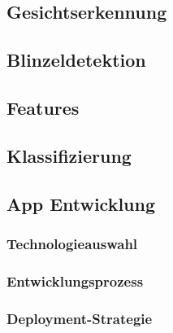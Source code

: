 \subsection{Gesichtserkennung}
\label{sec:facedetection}

\subsection{Blinzeldetektion}
\label{sec:blinkdetection}

\subsection{Features}
\label{sec:features}

\subsection{Klassifizierung}
\label{sec:classification}

\subsection{App Entwicklung}
\label{ssec:appEntwicklung}
	
	\subsubsection{Technologieauswahl}
	\label{sssec:technologie}
		
	\subsubsection{Entwicklungsprozess}
	\label{sssec:entwicklung}
		
	\subsubsection{Deployment-Strategie}
	\label{sssec:deployment}
